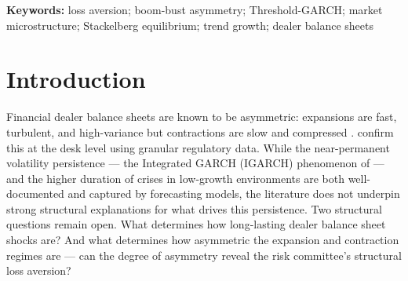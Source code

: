 \documentclass[12pt,a4paper]{article}
\theoremstyle{definition}
\begin{document}
\noindent\textbf{Keywords:} loss aversion; boom-bust asymmetry; Threshold-GARCH; market microstructure; Stackelberg equilibrium; trend growth; dealer balance sheets

\newpage


\section{Introduction}
\label{sec:introduction}

Financial dealer balance sheets are known to be asymmetric: expansions
are fast, turbulent, and high-variance but contractions are slow and
compressed \citep{adrian2010,adrian2014,brunnermeier2009}. \citet{li2025}
confirm this at the desk level using granular regulatory data. While the
near-permanent volatility persistence --- the Integrated GARCH (IGARCH)
phenomenon of \citet{engle1986} --- and the higher duration of crises in
low-growth environments \citep{reinhart2009} are both well-documented and
captured by forecasting models, the literature does not underpin strong
structural explanations for what drives this persistence. Two structural
questions remain open. What determines how long-lasting dealer balance
sheet shocks are? And what determines how asymmetric the expansion and
contraction regimes are --- can the degree of asymmetry reveal the risk
committee's structural loss aversion?
\end{document}
